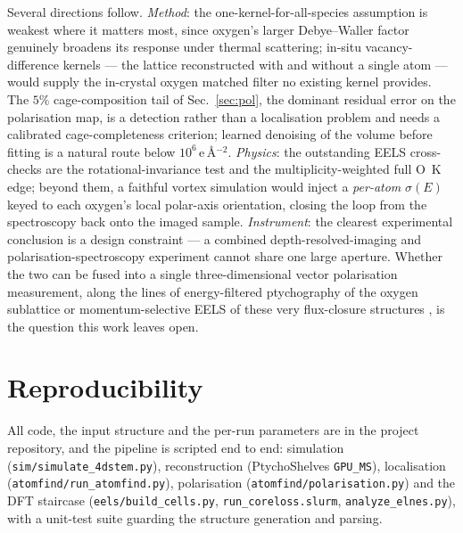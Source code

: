 \documentclass[aps,prb,twocolumn,superscriptaddress,floatfix,nofootinbib]{revtex4-2}
\begin{document}
Several directions follow. \emph{Method}: the one-kernel-for-all-species assumption is weakest
where it matters most, since oxygen's larger Debye--Waller factor genuinely broadens its
response under thermal scattering; in-situ vacancy-difference kernels --- the lattice
reconstructed with and without a single atom --- would supply the in-crystal oxygen matched
filter no existing kernel provides. The $5\%$ cage-composition tail of Sec.~\ref{sec:pol}, the
dominant residual error on the polarisation map, is a detection rather than a localisation
problem and needs a calibrated cage-completeness criterion; learned denoising of the volume
before fitting \citep{Wu2026} is a natural route below $10^{6}$\,e\,\AA$^{-2}$.
\emph{Physics}: the outstanding EELS cross-checks are the rotational-invariance test and the
multiplicity-weighted full O~K edge; beyond them, a faithful vortex simulation would inject a
\emph{per-atom} $\sigma(E)$ keyed to each oxygen's local polar-axis orientation, closing the
loop from the spectroscopy back onto the imaged sample. \emph{Instrument}: the clearest
experimental conclusion is a design constraint --- a combined depth-resolved-imaging and
polarisation-spectroscopy experiment cannot share one large aperture. Whether the two can be
fused into a single three-dimensional vector polarisation measurement, along the lines of
energy-filtered ptychography of the oxygen sublattice \citep{Dong2024} or momentum-selective
EELS of these very flux-closure structures \citep{Huang2026}, is the question this work leaves
open.

\section{Reproducibility}

All code, the input structure and the per-run parameters are in the project repository, and the
pipeline is scripted end to end: simulation (\texttt{sim/simulate\_4dstem.py}), reconstruction
(PtychoShelves \texttt{GPU\_MS}), localisation (\texttt{atomfind/run\_atomfind.py}),
polarisation (\texttt{atomfind/polarisation.py}) and the DFT staircase
(\texttt{eels/build\_cells.py}, \texttt{run\_coreloss.slurm}, \texttt{analyze\_elnes.py}), with
a unit-test suite guarding the structure generation and parsing.
\end{document}
